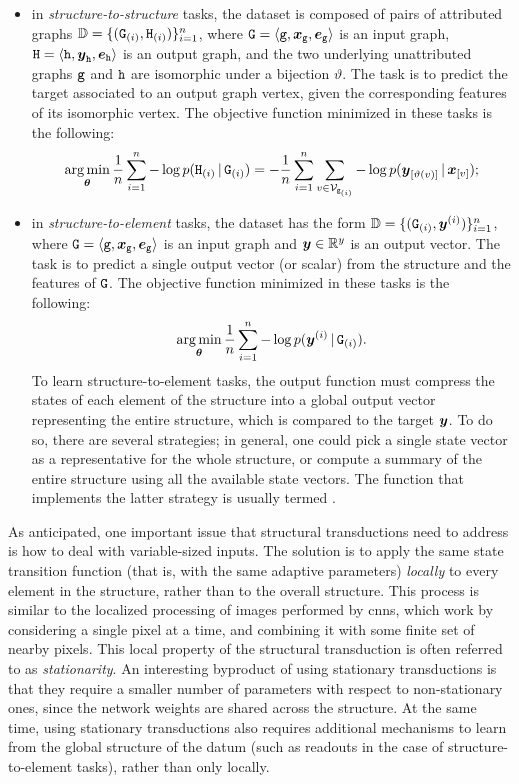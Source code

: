 \begin{itemize}
    \item in \emph{structure-to-structure} tasks, the dataset is composed of pairs of attributed graphs $\Data = \{(\PatternGraph{g}{i}, \PatternGraph{h}{i})\}_{i=1}^n$, where $\AttrGraph{g} = \VectorGraph{x}{g}$ is an input graph, $\AttrGraph{h} = \VectorGraph{y}{h}$ is an output graph, and the two underlying unattributed graphs $\mathtt{g}$ and $\mathtt{h}$ are isomorphic under a bijection $\vartheta$. The task is to predict the target associated to an output graph vertex, given the corresponding features of its isomorphic vertex. The objective function minimized in these tasks is the following:
    $$\argmin_{\Param} \frac{1}{n} \sum_{i=1}^n -\log p(\PatternGraph{h}{i} \given \PatternGraph{g}{i}) = -\frac{1}{n} \sum_{i=1}^n \sum_{v \in \Nodes{g_{(i)}}} -\log p(\Elem{y}{\vartheta(v)} \given \Elem{x}{v});$$
    \item in \emph{structure-to-element} tasks, the dataset has the form  $\Data = \{(\PatternGraph{g}{i}, \PatternVector{y}{i})\}_{i=1}^n$, where $\AttrGraph{g} = \VectorGraph{x}{g}$ is an input graph and $\Vector{y} \in \Real^y$ is an output vector. The task is to predict a single output vector (or scalar) from the structure and the features of $\AttrGraph{g}$. The  objective function minimized in these tasks is the following:
    $$\argmin_{\Param} \frac{1}{n} \sum_{i=1}^n - \log p(\PatternVector{y}{i} \given \PatternGraph{g}{i}).$$
    To learn structure-to-element tasks, the output function must compress the states of each element of the structure into a global output vector representing the entire structure, which is compared to the target $\Vector{y}$. To do so, there are several strategies; in general, one could pick a single state vector as a representative for the whole structure, or compute a summary of the entire structure using all the available state vectors. The function that implements the latter strategy is usually termed .
\end{itemize}

As anticipated, one important issue that structural transductions need to address is how to deal with variable-sized inputs. The solution is to apply the same state transition function (that is, with the same adaptive parameters) \emph{locally} to every element in the structure, rather than to the overall structure. This process is similar to the localized processing of images performed by \glspl{cnn}, which work by considering a single pixel at a time, and combining it with some finite set of nearby pixels. This local property of the structural transduction is often referred to as \emph{stationarity}. An interesting byproduct of using stationary transductions is that they require a smaller number of parameters with respect to non-stationary ones, since the network weights are shared across the structure. At the same time, using stationary transductions also requires additional mechanisms to learn from the global structure of the datum (such as readouts in the case of structure-to-element tasks), rather than only locally.

